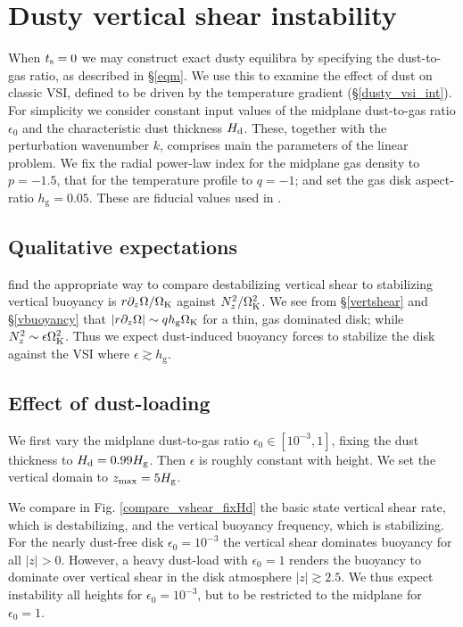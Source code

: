 \section{
  Dusty vertical shear instability}\label{results} 

When $t_\mathrm{s}=0$ we may construct exact dusty equilibra by specifying
the dust-to-gas ratio, as described in \S\ref{eqm}. We use this to
examine the effect of dust on classic VSI, defined to be driven by the
temperature gradient (\S\ref{dusty_vsi_int}). For simplicity we
consider constant input values of the midplane dust-to-gas ratio
$\epsilon_0$ and the characteristic dust thickness $H_\mathrm{d}$. These,
together with the perturbation wavenumber $k$, comprises main the
parameters of the linear problem. We fix the radial power-law index
for the midplane gas density to $p = -1.5$, that for the
temperature profile to $q=-1$; and set the gas disk aspect-ratio
$h_\mathrm{g}=0.05$. These are fiducial values used in . 

\subsection{Qualitative expectations}
 find the appropriate way to compare 
destabilizing vertical shear to stabilizing vertical buoyancy is
$r\partial_z\Omega/\Omega_{\rm K}$ against $N_z^2/\Omega_{\rm K}^2$. We see from \S\ref{vertshear}
and \S\ref{vbuoyancy} that $|r\partial_z\Omega|\sim q h_\mathrm{g}\Omega_{\rm K}$ for a
thin, gas dominated disk; while $N_z^2\sim \epsilon\Omega_{\rm K}^2$. Thus we
expect dust-induced buoyancy forces to stabilize the disk against the
VSI where $\epsilon \gtrsim h_\mathrm{g}$. 


\subsection{Effect of dust-loading}
We first vary the midplane dust-to-gas ratio 
$\epsilon_0\in[10^{-3},1]$, fixing the dust thickness to 
$H_\mathrm{d}=0.99H_\mathrm{g}$. Then  $\epsilon$ is roughly constant with height. We
set the vertical domain to $z_\mathrm{max}=5H_\mathrm{g}$.  

We compare in Fig. \ref{compare_vshear_fixHd} the basic state
vertical shear rate, which is destabilizing, and the vertical buoyancy
frequency, which is stabilizing. For the nearly dust-free disk
$\epsilon_0=10^{-3}$ the vertical shear dominates buoyancy for all
$|z|>0$. However, a heavy dust-load with $\epsilon_0=1$ renders the
buoyancy to dominate over vertical shear in the disk atmosphere
$|z|\gtrsim 2.5$. We thus expect instability all heights for
$\epsilon_0=10^{-3}$, but to be restricted to the midplane for
$\epsilon_0=1$. 

